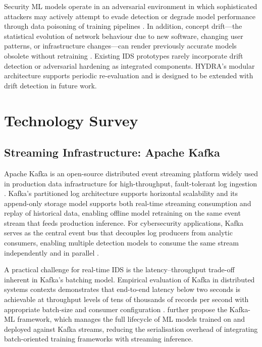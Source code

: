 \documentclass[12pt,a4paper]{report}
\begin{document}
Security ML models operate in an adversarial environment in which sophisticated attackers may actively attempt to evade detection or degrade model performance through data poisoning of training pipelines \citep{schwarzschild2021,goldblum2023}. In addition, concept drift---the statistical evolution of network behaviour due to new software, changing user patterns, or infrastructure changes---can render previously accurate models obsolete without retraining \citep{gama2014}. Existing IDS prototypes rarely incorporate drift detection or adversarial hardening as integrated components. HYDRA's modular architecture supports periodic re-evaluation and is designed to be extended with drift detection in future work.

\section{Technology Survey}
\label{sec:techsurvey}

\subsection{Streaming Infrastructure: Apache Kafka}
\label{sec:kafka}

Apache Kafka is an open-source distributed event streaming platform widely used in production data infrastructure for high-throughput, fault-tolerant log ingestion \citep{kafka2024}. Kafka's partitioned log architecture supports horizontal scalability and its append-only storage model supports both real-time streaming consumption and replay of historical data, enabling offline model retraining on the same event stream that feeds production inference. For cybersecurity applications, Kafka serves as the central event bus that decouples log producers from analytic consumers, enabling multiple detection models to consume the same stream independently and in parallel \citep{kafka2024}.

A practical challenge for real-time IDS is the latency--throughput trade-off inherent in Kafka's batching model. Empirical evaluation of Kafka in distributed systems contexts demonstrates that end-to-end latency below two seconds is achievable at throughput levels of tens of thousands of records per second with appropriate batch-size and consumer configuration \citep{raptis2023,martin2022}. \citet{martin2022} further propose the Kafka-ML framework, which manages the full lifecycle of ML models trained on and deployed against Kafka streams, reducing the serialisation overhead of integrating batch-oriented training frameworks with streaming inference.
\end{document}
